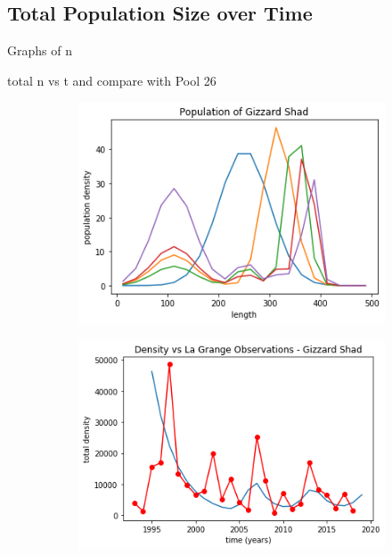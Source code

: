 \documentclass[11pt,oneside]{amsart}
\theoremstyle{definition}
\begin{document}
\subsection{Total Population Size over Time}
Graphs of n

total n vs t and compare with Pool 26

\begin{figure}
\centering
\begin{subfigure}[b]{.32\textwidth}
  \includegraphics[width=\textwidth]{figures/popdensity.png}
     \caption{}
  \label{fig:popdensity}
\end{subfigure}
\begin{subfigure}[b]{.32\textwidth}
   \includegraphics[width=\textwidth]{figures/lagrange.png}
     \caption{}
\label{fig:lagrange}
\end{subfigure}

\end{figure}
\end{document}

